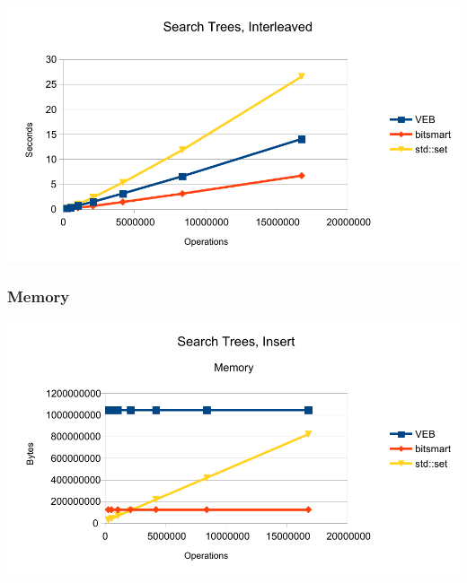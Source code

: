 \includegraphics[width=\textwidth]{graphs/st_interleaved.pdf}

\subsubsection{Memory}
\includegraphics[width=\textwidth]{graphs/st_insert_memory.pdf}
